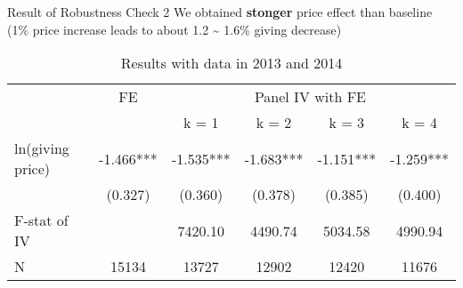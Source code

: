 \documentclass[
  ignorenonframetext,
]{beamer}
\begin{document}
\begin{frame}{Result of Robustness Check 2}
\protect\hypertarget{result-of-robustness-check-2}{}
We obtained \textbf{stonger} price effect than baseline (1\% price
increase leads to about 1.2 \textasciitilde{} 1.6\% giving decrease)

\begin{table}

\caption{\label{tab:kableRobust2EstimateElasticity}Results with data in 2013 and 2014}
\centering
\fontsize{9}{11}\selectfont
\begin{tabular}[t]{lccccc}
\toprule
\multicolumn{1}{c}{ } & \multicolumn{1}{c}{FE} & \multicolumn{4}{c}{Panel IV with FE} \\
\cmidrule(l{3pt}r{3pt}){2-2} \cmidrule(l{3pt}r{3pt}){3-6}
 &  & k = 1 & k = 2 & k = 3 & k = 4\\
\midrule
ln(giving price) & -1.466*** & -1.535*** & -1.683*** & -1.151*** & -1.259***\\
 & (0.327) & (0.360) & (0.378) & (0.385) & (0.400)\\
F-stat of IV &  & 7420.10 & 4490.74 & 5034.58 & 4990.94\\
N & 15134 & 13727 & 12902 & 12420 & 11676\\
\bottomrule
\end{tabular}
\end{table}
\end{frame}
\end{document}

